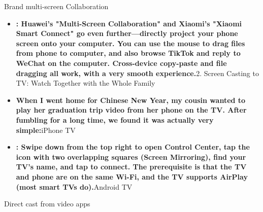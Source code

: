 


Brand multi-screen Collaboration

\begin{itemize}
  \item \textbf{: Huawei's "Multi-Screen Collaboration" and Xiaomi's "Xiaomi Smart Connect" go even further—directly project your phone screen onto your computer. You can use the mouse to drag files from phone to computer, and also browse TikTok and reply to WeChat on the computer. Cross-device copy-paste and file dragging all work, with a very smooth experience.}2. Screen Casting to TV: Watch Together with the Whole Family
  \item \textbf{When I went home for Chinese New Year, my cousin wanted to play her graduation trip video from her phone on the TV. After fumbling for a long time, we found it was actually very simple:}iPhone TV
  \item \textbf{: Swipe down from the top right to open Control Center, tap the icon with two overlapping squares (Screen Mirroring), find your TV's name, and tap to connect. The prerequisite is that the TV and phone are on the same Wi-Fi, and the TV supports AirPlay (most smart TVs do).}Android TV
\end{itemize}


Direct cast from video apps

